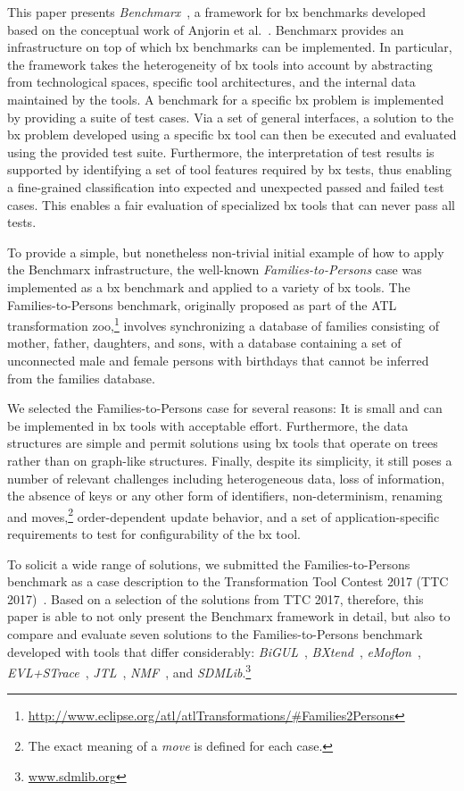 This paper presents \emph{Benchmarx}~\cite{Anjorin2017}, a framework for bx benchmarks developed based on the conceptual work of Anjorin et al.~\cite{AnjorinCG0RS14}.
Benchmarx provides an infrastructure on top of which bx benchmarks can be implemented. 
In particular, the framework takes the heterogeneity of bx tools into account by abstracting from technological spaces, specific tool architectures, and the internal data maintained by the tools. 
A benchmark for a specific bx problem is implemented by providing a suite of test cases. 
Via a set of general interfaces, a solution to the bx problem developed using a specific bx tool can then be executed and evaluated using the provided test suite.  
Furthermore, the interpretation of test results is supported by identifying a set of tool features required by bx tests, thus enabling a fine-grained classification into expected and unexpected passed and failed test cases.
This enables a fair evaluation of specialized bx tools that can never pass all tests.

To provide a simple, but nonetheless non-trivial initial example of how to apply the Benchmarx infrastructure, the well-known \emph{Families-to-Persons} case was implemented as a bx benchmark and applied to a variety of bx tools. 
The Families-to-Persons benchmark, originally proposed as part of the ATL~\cite{SCP-Jouault2008} transformation zoo,\footnote{\url{http://www.eclipse.org/atl/atlTransformations/\#Families2Persons}} involves synchronizing a database of families consisting of mother, father, daughters, and sons, with a database containing a set of unconnected male and female persons with birthdays that cannot be inferred from the families database. 

We selected the Families-to-Persons case for several reasons: It is small and can be implemented in bx tools with acceptable effort. Furthermore, the data structures are simple and permit solutions using bx tools that operate on trees rather than on graph-like structures. 
Finally, despite its simplicity, it still poses a number of relevant challenges including heterogeneous data, loss of information, the absence of keys or any other form of identifiers, non-determinism, renaming and moves,\footnote{The exact meaning of a \emph{move} is defined for each case.} order-dependent update behavior, and a set of application-specific requirements to test for configurability of the bx tool.

To solicit a wide range of solutions, we submitted the Families-to-Persons benchmark as a case description to the Transformation Tool Contest 2017 (TTC 2017)~\cite{Anjorin2017a}.
Based on a selection of the solutions from TTC 2017, therefore, this paper is able to not only present the Benchmarx framework in detail, but also to compare and evaluate seven solutions to the Families-to-Persons benchmark developed with tools that differ considerably: 
\emph{BiGUL}~\cite{PEPM2016-Ko}, 
\emph{BXtend}~\cite{MODELSWARD2018-Buchmann}, 
\emph{eMoflon}~\cite{Leblebici2014a}, 
\emph{EVL+STrace}~\cite{IST2018-Samimi}, 
\emph{JTL}~\cite{SLE2010-Cicchetti}, 
\emph{NMF}~\cite{SoSyM2017-Hinkel}, and 
\emph{SDMLib}.\footnote{\url{www.sdmlib.org}}

